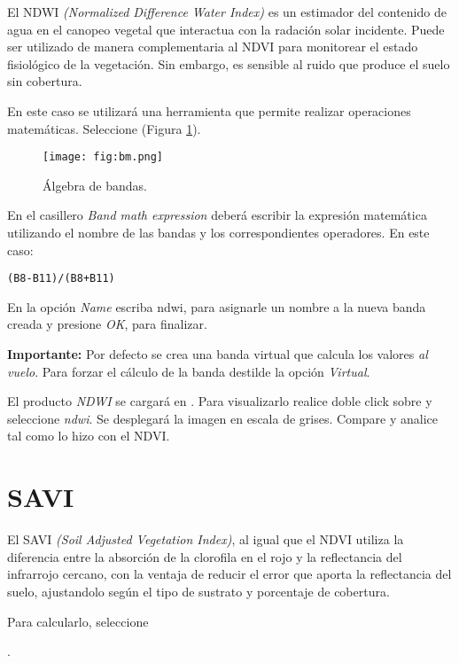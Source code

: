 El NDWI \emph{(Normalized Difference Water Index)} es un estimador del contenido de agua en el canopeo vegetal que interactua con la radación solar incidente. Puede ser utilizado de manera complementaria al NDVI para monitorear el estado fisiológico de la vegetación. Sin embargo, es sensible al ruido que produce el suelo sin cobertura.


En este caso se utilizará una herramienta que permite realizar operaciones matemáticas. Seleccione  (Figura \ref{fig:bm2}).

 \begin{figure}[h!]
     \centering
     \texttt{[image: fig:bm.png]}
     \caption{Álgebra de bandas.}
     \label{fig:bm2}
 \end{figure}


En el casillero \emph{Band math expression} deberá escribir la expresión matemática utilizando el nombre de las bandas y los correspondientes operadores. En este caso:

\begin{center}
\texttt{(B8-B11)/(B8+B11)}
\end{center}

En la opción \emph{Name} escriba ndwi, para asignarle un nombre a la nueva banda creada y presione \emph{OK}, para finalizar.

 {\bf Importante:} Por defecto se crea una banda virtual que calcula los valores \emph{al vuelo}. Para forzar el cálculo de la banda destilde la opción \emph{Virtual}.

El producto \emph{NDWI} se cargará en . Para visualizarlo realice doble click sobre  y seleccione \emph{ndwi}. Se desplegará la imagen en escala de grises. Compare y analice tal como lo hizo con el NDVI.

\section{SAVI}

El SAVI \emph{(Soil Adjusted Vegetation Index)}, al igual que el NDVI utiliza la diferencia entre la absorción de la clorofila en el rojo y la reflectancia del infrarrojo cercano, con la ventaja de reducir el error que aporta la reflectancia del suelo, ajustandolo según el tipo de sustrato y porcentaje de cobertura.

Para calcularlo, seleccione

\begin{center}
.
\end{center}

